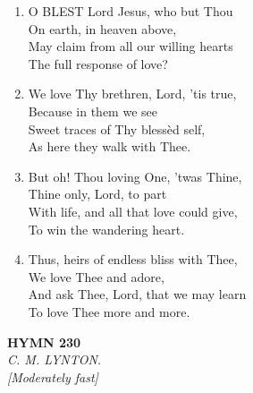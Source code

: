 \begin{enumerate}
    \item O BLEST Lord Jesus, who but Thou \\
            On earth, in heaven above, \\
        May claim from all our willing hearts \\
            The full response of love?

    \item We love Thy brethren, Lord, 'tis true, \\
            Because in them we see \\
        Sweet traces of Thy bless\`ed self, \\
            As here they walk with Thee.

    \item But oh! Thou loving One, 'twas Thine, \\
            Thine only, Lord, to part \\
        With life, and all that love could give, \\
            To win the wandering heart.

    \item Thus, heirs of endless bliss with Thee, \\
            We love Thee and adore, \\
        And ask Thee, Lord, that we may learn \\
            To love Thee more and more.

\end{enumerate}

\newpage
\begin{center}
    {\Large \textbf{HYMN 230}}
    \\
    \textit{C. M. LYNTON.}
    \\
    \textit{\small [Moderately fast]}
\end{center}
\vspace{1em}

